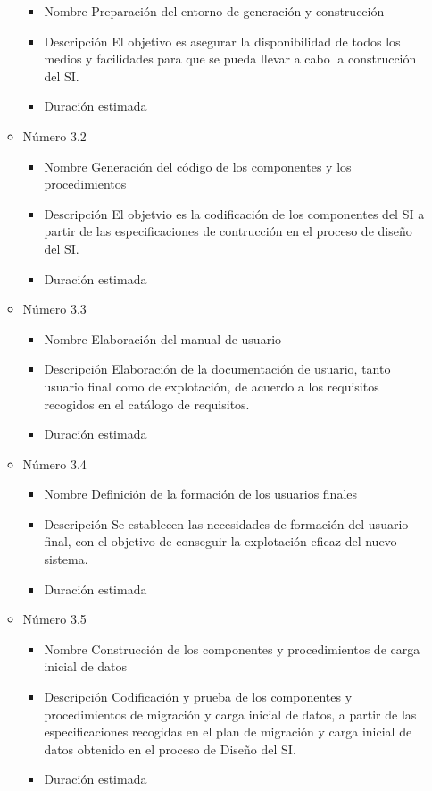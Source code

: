 \documentclass[11pt,a4paper,spanish,twoside]{report}
\begin{document}
\begin{itemize}
\begin{itemize}
\begin{itemize}
\item{Nombre} Preparación del entorno de generación y construcción
\item{Descripción} El objetivo es asegurar la disponibilidad de todos los
  medios y facilidades para que se pueda llevar a cabo la construcción del SI.
\item{Duración estimada} 
\end{itemize}
\item{Número} 3.2
\begin{itemize}
\item{Nombre} Generación del código de los componentes y los procedimientos
\item{Descripción} El objetvio es la codificación de los componentes del SI a
  partir de las especificaciones de contrucción en el proceso de diseño del SI.
\item{Duración estimada} 
\end{itemize}
\item{Número} 3.3
\begin{itemize}
\item{Nombre} Elaboración del manual de usuario
\item{Descripción} Elaboración de la documentación de usuario, tanto usuario
  final como de explotación, de acuerdo a los requisitos recogidos en el
  catálogo de requisitos.
\item{Duración estimada} 
\end{itemize}
\item{Número} 3.4
\begin{itemize}
\item{Nombre} Definición de la formación de los usuarios finales
\item{Descripción} Se establecen las necesidades de formación del usuario
  final, con el objetivo de conseguir la explotación eficaz del nuevo sistema.
\item{Duración estimada} 
\end{itemize}
\item{Número} 3.5
\begin{itemize}
\item{Nombre} Construcción de los componentes y procedimientos de carga 
inicial de datos
\item{Descripción} Codificación y prueba de los componentes y procedimientos
  de migración y carga inicial de datos, a partir de las especificaciones
  recogidas en el plan de migración y carga inicial de datos obtenido en el
  proceso de Diseño del SI.
\item{Duración estimada} 

\end{itemize}
\end{itemize}
\end{itemize}
\end{document}
